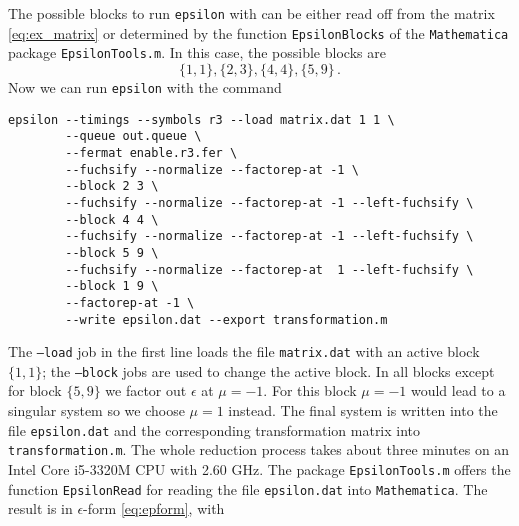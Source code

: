 \documentclass[12pt]{article}
\numberwithin{equation}{section}
\numberwithin{figure}{section}
\begin{document}
    The possible blocks to run \texttt{epsilon} with can be either read off from the matrix \eqref{eq:ex_matrix} or determined by the function \texttt{EpsilonBlocks} of the \texttt{Mathematica} package \texttt{EpsilonTools.m}.
    In this case, the possible blocks are
    \[
      \{1,1\},
      \{2,3\},
      \{4,4\},
      \{5,9\}\,.
    \]
    Now we can run \texttt{epsilon} with the command
    \begin{lstlisting}[basicstyle=\ttfamily,xleftmargin=-2em]
      epsilon --timings --symbols r3 --load matrix.dat 1 1 \
        --queue out.queue \
        --fermat enable.r3.fer \
        --fuchsify --normalize --factorep-at -1 \
        --block 2 3 \
        --fuchsify --normalize --factorep-at -1 --left-fuchsify \
        --block 4 4 \
        --fuchsify --normalize --factorep-at -1 --left-fuchsify \
        --block 5 9 \
        --fuchsify --normalize --factorep-at  1 --left-fuchsify \
        --block 1 9 \
        --factorep-at -1 \
        --write epsilon.dat --export transformation.m
    \end{lstlisting}
    The \texttt{--load} job in the first line loads the file \texttt{matrix.dat} with an active block $\{1,1\}$; the \texttt{--block} jobs are used to change the active block.
    In all blocks except for block $\{5,9\}$ we factor out $\epsilon$ at $\mu=-1$.
    For this block $\mu=-1$ would lead to a singular system so we choose $\mu=1$ instead.
    The final system is written into the file \texttt{epsilon.dat} and the corresponding transformation matrix into \texttt{transformation.m}.
    The whole reduction process takes about three minutes on an Intel Core i5-3320M CPU with 2.60 GHz.
    The package \texttt{EpsilonTools.m} offers the function \texttt{EpsilonRead} for reading the file \texttt{epsilon.dat} into \texttt{Mathematica}.
    The result is in $\epsilon$-form \eqref{eq:epform}, with
\end{document}
